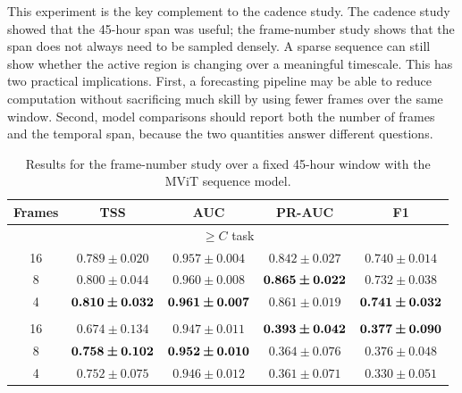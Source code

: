 This experiment is the key complement to the cadence study. The cadence study showed that the 45-hour span was useful; the frame-number study shows that the span does not always need to be sampled densely. A sparse sequence can still show whether the active region is changing over a meaningful timescale. This has two practical implications. First, a forecasting pipeline may be able to reduce computation without sacrificing much skill by using fewer frames over the same window. Second, model comparisons should report both the number of frames and the temporal span, because the two quantities answer different questions.

\begin{table}[H]
\caption{Results for the frame-number study over a fixed 45-hour window with the MViT sequence model.}
\centering
\label{tab:frames}
\small
\renewcommand{\arraystretch}{1.15}
\setlength{\tabcolsep}{8pt}
\begin{tabular}{@{}ccccc@{}}
\toprule
Frames & TSS & AUC & PR-AUC & F1 \\
\midrule
\multicolumn{5}{c}{$\geq C$ task} \\
\midrule
16 & $0.789 \pm 0.020$ & $0.957 \pm 0.004$ & $0.842 \pm 0.027$ & $0.740 \pm 0.014$ \\
8  & $0.800 \pm 0.044$ & $0.960 \pm 0.008$ & $\bm{0.865 \pm 0.022}$ & $0.732 \pm 0.038$ \\
4  & $\bm{0.810 \pm 0.032}$ & $\bm{0.961 \pm 0.007}$ & $0.861 \pm 0.019$ & $\bm{0.741 \pm 0.032}$ \\
\addlinespace
\multicolumn{5}{c}{$\geq M$ task} \\
\midrule
16 & $0.674 \pm 0.134$ & $0.947 \pm 0.011$ & $\bm{0.393 \pm 0.042}$ & $\bm{0.377 \pm 0.090}$ \\
8  & $\bm{0.758 \pm 0.102}$ & $\bm{0.952 \pm 0.010}$ & $0.364 \pm 0.076$ & $0.376 \pm 0.048$ \\
4  & $0.752 \pm 0.075$ & $0.946 \pm 0.012$ & $0.361 \pm 0.071$ & $0.330 \pm 0.051$ \\
\bottomrule
\end{tabular}
\end{table}

